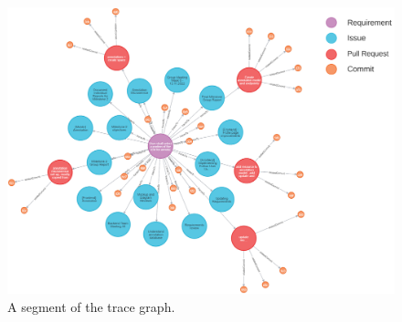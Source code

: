 


\begin{figure}[htb]
    \centering
    \includegraphics[width=1\linewidth]{figs/rawTraceGraph.png}
    \caption{A segment of the trace graph.}
    \label{fig:rawtracegraph}
  \end{figure}

